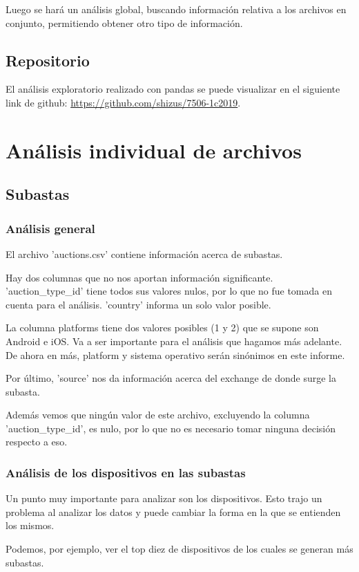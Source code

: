 \documentclass[a4paper, 12pt]{article}
\begin{document}
	 Luego se hará un análisis global, buscando información relativa a los archivos en conjunto, permitiendo obtener otro tipo de información.
     \subsection{Repositorio}
     El análisis exploratorio realizado con pandas se puede visualizar en el siguiente link de github: \href{https://github.com/shizus/7506-1c2019}{https://github.com/shizus/7506-1c2019}.
     
\section{Análisis individual de archivos}
\subsection{Subastas}
	\subsubsection{Análisis general} \label{analisis general}
	El archivo 'auctions.csv' contiene información acerca de subastas.
	
	Hay dos columnas que no nos aportan información significante. 'auction\_type\_id' tiene todos sus valores 		nulos, por lo que no fue tomada en cuenta para el análisis. 'country' informa un solo valor posible.

	 La columna platforms tiene dos valores posibles (1 y 2) que se supone son Android e iOS. Va a ser importante para el análisis que hagamos más adelante. De ahora en más, platform y sistema operativo serán sinónimos en este informe.

	 Por último, 'source' nos da información acerca del exchange de donde surge la subasta.

	 Además vemos que ningún valor de este archivo, excluyendo la columna 'auction\_type\_id', es nulo, por lo que no es necesario tomar ninguna decisión respecto a eso.

	\subsubsection{Análisis de los dispositivos en las subastas}
	Un punto muy importante para analizar son los dispositivos. Esto trajo un problema al analizar los datos y puede cambiar la forma en la que se entienden los mismos.
	
	Podemos, por ejemplo, ver el top diez de dispositivos de los cuales se generan más subastas.
	
\end{document}
